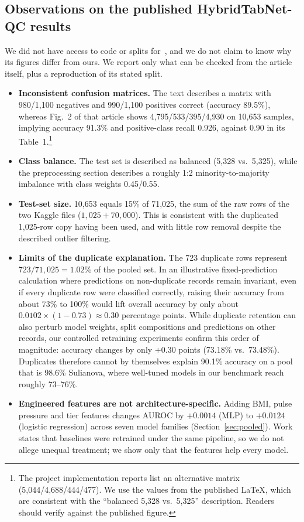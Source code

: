 \documentclass[journal]{IEEEtran}
\newcommand{\htn}{HybridTabNet-QC}
\begin{document}
\subsection{Observations on the published \htn{} results}
We did not have access to code or splits for~\cite{mahmud2026}, and we do not claim to know why its figures differ from ours. We report only what can be checked from the article itself, plus a reproduction of its stated split.
\begin{itemize}
\item \textbf{Inconsistent confusion matrices.} The text describes a matrix with 980/1{,}100 negatives and 990/1{,}100 positives correct (accuracy 89.5\%), whereas Fig.~2 of that article shows 4{,}795/533/395/4{,}930 on 10{,}653 samples, implying accuracy 91.3\% and positive-class recall 0.926, against 0.90 in its Table~1.\footnote{The project implementation reports list an alternative matrix (5{,}044/4{,}688/444/477). We use the values from the published LaTeX, which are consistent with the ``balanced 5{,}328 vs.\ 5{,}325'' description. Readers should verify against the published figure.}
\item \textbf{Class balance.} The test set is described as balanced (5{,}328 vs.\ 5{,}325), while the preprocessing section describes a roughly 1:2 minority-to-majority imbalance with class weights 0.45/0.55.
\item \textbf{Test-set size.} 10{,}653 equals 15\% of 71{,}025, the sum of the raw rows of the two Kaggle files ($1{,}025+70{,}000$). This is consistent with the duplicated 1{,}025-row copy having been used, and with little row removal despite the described outlier filtering.
\item \textbf{Limits of the duplicate explanation.} The 723 duplicate rows represent $723/71{,}025=1.02\%$ of the pooled set. In an illustrative fixed-prediction calculation where predictions on non-duplicate records remain invariant, even if every duplicate row were classified correctly, raising their accuracy from about 73\% to 100\% would lift overall accuracy by only about $0.0102\times(1-0.73)\approx 0.30$ percentage points. While duplicate retention can also perturb model weights, split compositions and predictions on other records, our controlled retraining experiments confirm this order of magnitude: accuracy changes by only $+0.30$ points (73.18\% vs.\ 73.48\%). Duplicates therefore cannot by themselves explain 90.1\% accuracy on a pool that is 98.6\% Sulianova, where well-tuned models in our benchmark reach roughly 73--76\%.
\item \textbf{Engineered features are not architecture-specific.} Adding BMI, pulse pressure and tier features changes AUROC by $+0.0014$ (MLP) to $+0.0124$ (logistic regression) across seven model families (Section~\ref{sec:pooled}). Work~\cite{mahmud2026} states that baselines were retrained under the same pipeline, so we do not allege unequal treatment; we show only that the features help every model.
\end{itemize}
\end{document}
